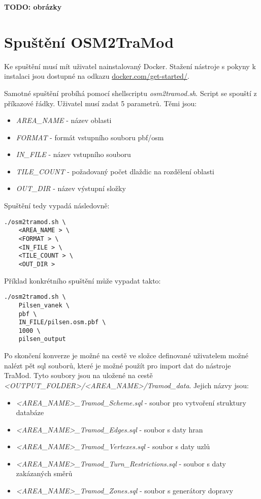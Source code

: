 \textbf{TODO: obrázky}

\section{Spuštění OSM2TraMod}

Ke spuštění musí mít uživatel nainstalovaný Docker. Stažení nástroje s pokyny k instalaci jsou dostupné na odkazu \url{docker.com/get-started/}. 

Samotné spuštění probíhá pomocí shellscriptu \textit{osm2tramod.sh}. Script se spouští z příkazové řádky. Uživatel musí zadat 5 parametrů. Těmi jsou: 

\begin{itemize}
	\item \textit{AREA\_NAME} - název oblasti
	\item \textit{FORMAT} - formát vstupního souboru pbf/osm 
	\item \textit{IN\_FILE} - název vstupního souboru
	\item \textit{TILE\_COUNT} - požadovaný počet dlaždic na rozdělení oblasti
	\item \textit{OUT\_DIR} - název výstupní složky
\end{itemize}

Spuštění tedy vypadá následovně: 

\begin{lstlisting}
./osm2tramod.sh \
	<AREA_NAME > \
	<FORMAT > \
	<IN_FILE > \
	<TILE_COUNT > \
	<OUT_DIR >
\end{lstlisting}

Příklad konkrétního spuštění může vypadat takto: 
\begin{lstlisting}
./osm2tramod.sh \
 	Pilsen_vanek \
 	pbf \
 	IN_FILE/pilsen.osm.pbf \
 	1000 \
 	pilsen_output
\end{lstlisting}

Po skončení konverze je možné na cestě ve složce definované uživatelem možné nalézt pět sql souborů, které je možné použít pro import dat do nástroje TraMod. Tyto soubory jsou na uložené na cestě \newline \textit{<OUTPUT\_FOLDER>/<AREA\_NAME>/Tramod\_data}. Jejich názvy jsou: 

\begin{itemize}

	\item \textit{<AREA\_NAME>\_Tramod\_Scheme.sql} - soubor pro vytvoření struktury databáze
	\item \textit{<AREA\_NAME>\_Tramod\_Edges.sql} - soubor s daty hran
	\item \textit{<AREA\_NAME>\_Tramod\_Vertexes.sql} - soubor s daty uzlů
	\item \textit{<AREA\_NAME>\_Tramod\_Turn\_Restrictions.sql} - soubor s daty zakázaných směrů
	\item \textit{<AREA\_NAME>\_Tramod\_Zones.sql} - soubor s generátory dopravy
\end{itemize}

